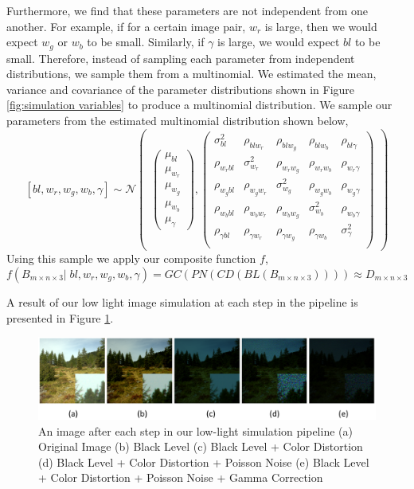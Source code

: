 \documentclass{article}
\begin{document}
Furthermore, we find that these parameters are not independent from one another. For example, if for a certain image pair, \(w_r\) is large, then we would expect \(w_g\) or \(w_b\) to be small. Similarly, if \(\gamma\) is large, we would expect \(bl\) to be small. Therefore, instead of sampling each parameter from independent distributions, we sample them from a multinomial. We estimated the mean, variance and covariance of the parameter distributions shown in Figure \ref{fig:simulation variables} to produce a multinomial distribution. We sample our parameters from the estimated multinomial distribution shown below, 
$$[bl, w_r, w_g, w_b, \gamma] \sim \mathcal{N}
\begin{pmatrix}
\begin{pmatrix}
\mu_{bl}\\
\mu_{w_r}\\
\mu_{w_g}\\
\mu_{w_b}\\
\mu_{\gamma}
\end{pmatrix}, 
\begin{pmatrix}
\sigma_{bl}^2 & \rho_{bl w_r} & \rho_{bl w_g} & \rho_{bl w_b} & \rho_{bl \gamma}\\
\rho_{w_r bl} & \sigma_{w_r}^2 & \rho_{w_r w_g} & \rho_{w_r w_b} & \rho_{w_r \gamma}\\
\rho_{w_g bl} & \rho_{w_g w_r} & \sigma_{w_g}^2 & \rho_{w_g w_b} & \rho_{w_g \gamma}\\
\rho_{w_b bl} & \rho_{w_b w_r} & \rho_{w_b w_g} & \sigma_{w_b}^2 & \rho_{w_b \gamma}\\
\rho_{\gamma bl} & \rho_{\gamma w_r} & \rho_{\gamma w_g} & \rho_{\gamma w_b} & \sigma_{\gamma}^2\\
\end{pmatrix}
\end{pmatrix}$$
Using this sample we apply our composite function $f$, 
$$f(B_{m\times n\times 3} |\; bl, w_r, w_g, w_b, \gamma) = GC(PN(CD(BL(B_{m\times n\times 3})))) \approx D_{m\times n\times 3}$$

A result of our low light image simulation at each step in the pipeline is presented in Figure \ref{fig: simulation results}.

\begin{figure}[t!]
  \centering
  \includegraphics[scale=0.42]{simulation_all}
  \caption{An image after each step in our low-light simulation pipeline (a) Original Image (b) Black Level (c) Black Level + Color Distortion (d) Black Level + Color Distortion + Poisson Noise (e) Black Level + Color Distortion + Poisson Noise + Gamma Correction}
  \label{fig: simulation results}
\end{figure}
\end{document}
